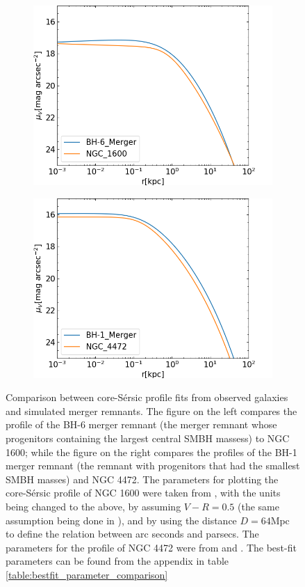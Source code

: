 \documentclass[english, oneside]{HYgradu}
\begin{document}
\begin{figure}
	\centering
	\begin{subfigure}[b]{0.49\textwidth}
		\includegraphics[width=\textwidth]{BH-6_NGC1600.png}
	\end{subfigure}
	\begin{subfigure}[b]{0.49\textwidth}
		\includegraphics[width=\textwidth]{BH-1_NGC4472.png}
	\end{subfigure}
	\caption{Comparison between core-Sérsic profile fits from observed galaxies and simulated merger remnants. The figure on the left compares the profile of the BH-6 merger remnant (the merger remnant whose progenitors containing the largest central SMBH massess) to NGC 1600; while the figure on the right compares the profiles of the BH-1 merger remnant (the remnant with progenitors that had the smallest SMBH masses) and NGC 4472. The parameters for plotting the core-Sérsic profile of NGC 1600 were taken from \cite{Thomas2016}, with the units being changed to the above, by assuming $V - R = 0.5$ (the same assumption being done in \cite{Lauer2007}), and by using the distance $D = 64 \mathrm{Mpc}$ \citep{Thomas2016} to define the relation between arc seconds and parsecs. The parameters for the profile of NGC 4472 were from \cite{Dullo2012} and \cite{Lauer2007}. The best-fit parameters can be found from the appendix in table \ref{table:bestfit_parameter_comparison}}

\end{figure}
\end{document}
